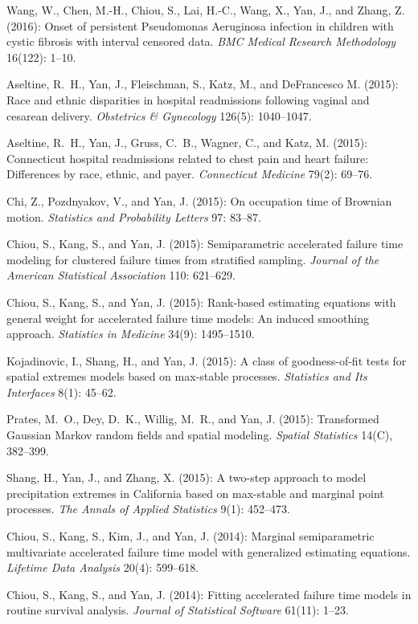 \documentclass[Statistics]{vita}
\begin{document}
\begin{vita}
\begin{Publications}
\begin{RefereedJournalArticles}
  \item *Wang, W., Chen, M.-H., Chiou, S., Lai, H.-C., Wang, X., Yan, J., and Zhang, Z. (2016): Onset of persistent Pseudomonas Aeruginosa infection in children with cystic fibrosis with interval censored data. {\em BMC Medical Research Methodology\/} 16(122): 1--10.
  \item Aseltine, R.~H., Yan, J., Fleischman, S., Katz, M., and DeFrancesco M. (2015): Race and ethnic disparities in hospital readmissions following vaginal and cesarean delivery. {\em Obstetrics \& Gynecology\/} 126(5): 1040--1047.
  \item Aseltine, R.~H., Yan, J., Gruss, C.~B., Wagner, C., and Katz, M. (2015): Connecticut hospital readmissions related to chest pain and heart failure: {D}ifferences by race, ethnic, and payer. {\em Connecticut Medicine\/} 79(2):  69--76.
  \item Chi, Z., Pozdnyakov, V., and Yan, J. (2015): On occupation time of Brownian motion. {\em Statistics and Probability Letters\/} 97: 83--87.
  \item *Chiou, S., Kang, S., and Yan, J. (2015): Semiparametric accelerated failure time modeling for clustered failure times from stratified sampling. {\em Journal of the American Statistical Association\/} 110: 621--629.
  \item *Chiou, S., Kang, S., and Yan, J. (2015): Rank-based estimating equations with general weight for accelerated failure time models: An induced smoothing approach. {\em Statistics in Medicine\/} 34(9): 1495--1510.
  \item Kojadinovic, I., Shang, H., and Yan, J. (2015): A class of goodness-of-fit tests for spatial extremes models based on max-stable processes. {\em Statistics and Its Interfaces\/} 8(1): 45--62.
  \item *Prates, M.~O., Dey, D.~K., Willig, M.~R., and Yan, J. (2015): Transformed Gaussian Markov random fields and spatial modeling. {\em Spatial Statistics\/} 14(C), 382--399.
  \item *Shang, H., Yan, J., and Zhang, X. (2015): A two-step approach to model precipitation extremes in {C}alifornia based on max-stable and marginal point processes. {\em The Annals of Applied Statistics\/} 9(1): 452--473.
  \item *Chiou, S., Kang, S., Kim, J., and Yan, J. (2014): Marginal semiparametric multivariate accelerated failure time model with generalized estimating equations. {\em Lifetime Data Analysis\/} 20(4): 599--618.
  \item *Chiou, S., Kang, S., and Yan, J. (2014): Fitting accelerated failure time models in routine survival analysis. {\em Journal of Statistical Software\/} 61(11): 1--23.

\end{RefereedJournalArticles}
\end{Publications}
\end{vita}
\end{document}
